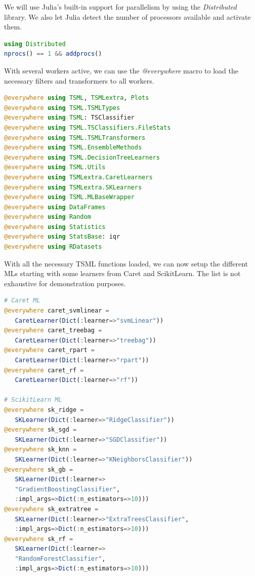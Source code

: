 \documentclass{juliacon}
\begin{document}
We will use Julia's built-in support for parallelism by using the \emph{Distributed} library. We also let Julia detect the number of processors available and activate them.

\begin{lstlisting}[language = Julia]
using Distributed 
nprocs() == 1 && addprocs()
\end{lstlisting}

With several workers active, we can use the \emph{@everywhere} macro to load the necessary filters and transformers to all workers.

\begin{lstlisting}[language = Julia]
@everywhere using TSML, TSMLextra, Plots
@everywhere using TSML.TSMLTypes
@everywhere using TSML: TSClassifier
@everywhere using TSML.TSClassifiers.FileStats
@everywhere using TSML.TSMLTransformers
@everywhere using TSML.EnsembleMethods
@everywhere using TSML.DecisionTreeLearners
@everywhere using TSML.Utils
@everywhere using TSMLextra.CaretLearners
@everywhere using TSMLextra.SKLearners
@everywhere using TSML.MLBaseWrapper
@everywhere using DataFrames
@everywhere using Random
@everywhere using Statistics
@everywhere using StatsBase: iqr
@everywhere using RDatasets
\end{lstlisting}

With all the necessary TSML functions loaded, we can now setup the different MLs starting with some learners from Caret and ScikitLearn. The list is not exhaustive for demonstration purposes.

\begin{lstlisting}[language = Julia]
# Caret ML
@everywhere caret_svmlinear = 
   CaretLearner(Dict(:learner=>"svmLinear"))
@everywhere caret_treebag = 
   CaretLearner(Dict(:learner=>"treebag"))
@everywhere caret_rpart = 
   CaretLearner(Dict(:learner=>"rpart"))
@everywhere caret_rf = 
   CaretLearner(Dict(:learner=>"rf"))

# ScikitLearn ML
@everywhere sk_ridge = 
   SKLearner(Dict(:learner=>"RidgeClassifier"))
@everywhere sk_sgd = 
   SKLearner(Dict(:learner=>"SGDClassifier"))
@everywhere sk_knn = 
   SKLearner(Dict(:learner=>"KNeighborsClassifier"))
@everywhere sk_gb = 
   SKLearner(Dict(:learner=>
   "GradientBoostingClassifier",
   :impl_args=>Dict(:n_estimators=>10)))
@everywhere sk_extratree = 
   SKLearner(Dict(:learner=>"ExtraTreesClassifier",
   :impl_args=>Dict(:n_estimators=>10)))
@everywhere sk_rf = 
   SKLearner(Dict(:learner=>
   "RandomForestClassifier",
   :impl_args=>Dict(:n_estimators=>10)))
\end{lstlisting}
\end{document}
